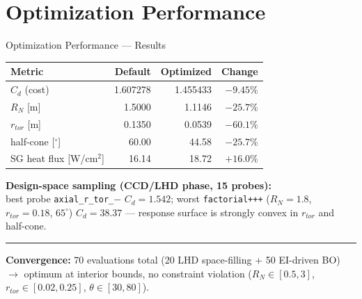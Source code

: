 \documentclass[aspectratio=169,10pt]{beamer}
\begin{document}
\section{Optimization Performance}

\begin{frame}{Optimization Performance --- Results}
  \centering
  \small
  \begin{tabular}{@{}lrrr@{}}
    \toprule
    Metric & Default & Optimized & Change \\
    \midrule
    $C_d$ (cost) & 1.607278 & 1.455433 & $\mathbf{-9.45\%}$ \\
    $R_N$ [m] & 1.5000 & 1.1146 & $-25.7\%$ \\
    $r_{tor}$ [m] & 0.1350 & 0.0539 & $-60.1\%$ \\
    half-cone [$^\circ$] & 60.00 & 44.58 & $-25.7\%$ \\
    SG heat flux [W/cm$^2$] & 16.14 & 18.72 & $+16.0\%$ \\
    \bottomrule
  \end{tabular}
  \vspace{6pt}

  \textbf{Design-space sampling (CCD/LHD phase, 15 probes):}\\[2pt]
  {\footnotesize best probe \texttt{axial\_r\_tor\_$-$} $C_d=1.542$;
  worst \texttt{factorial+++} ($R_N{=}1.8$, $r_{tor}{=}0.18$,
  $65^\circ$) $C_d=38.37$ --- response surface is strongly convex in
  $r_{tor}$ and half-cone.}\\[4pt]
  \hrule
  \vspace{4pt}
  \textbf{Convergence:} 70 evaluations total (20 LHD space-filling +
  50 EI-driven BO) $\rightarrow$ optimum at interior bounds, no
  constraint violation ($R_N\in[0.5,3]$, $r_{tor}\in[0.02,0.25]$,
  $\theta\in[30,80]$).
\end{frame}
\end{document}
